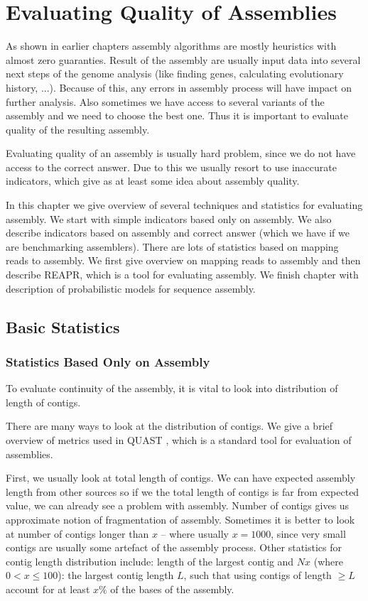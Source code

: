 \chapter{Evaluating Quality of Assemblies}

As shown in earlier chapters assembly algorithms are mostly
heuristics with almost zero guaranties. 
Result of the assembly are usually input data into several next steps
of the genome analysis (like finding genes, calculating evolutionary history, ...).
Because of this, any errors in assembly process will have impact on further analysis.
Also sometimes we have access to several variants of the assembly and we need
to choose the best one.
Thus it is important to evaluate quality of the resulting assembly.

Evaluating quality of an assembly is usually hard problem,
since we do not have access to the correct answer.
Due to this we usually resort to use inaccurate indicators, which
give as at least some idea about assembly quality.

In this chapter we give overview of several techniques and statistics
for evaluating assembly. We start with simple indicators based
only on assembly. We also describe indicators based on assembly and correct
answer (which we have if we are benchmarking assemblers). 
There are lots of statistics based on mapping reads to assembly. We first give
overview on mapping reads to assembly and then describe REAPR, which is a tool
for evaluating assembly. We finish chapter with description
of probabilistic models for sequence assembly.

\section{Basic Statistics}

\subsection{Statistics Based Only on Assembly}

To evaluate continuity of the assembly, it is vital
to look into distribution of length of contigs.

There are many ways to look at the distribution of contigs.
We give a brief overview of metrics used in QUAST \citep{Quast}, which
is a standard tool for evaluation of assemblies.

First, we usually look at total length of contigs. We can have expected assembly 
length from other sources so if we the total length of contigs is far from expected
value, we can already see a problem with assembly.
Number of contigs gives us approximate notion of fragmentation of assembly.
Sometimes it is better to look at number of contigs longer than $x$ -- where usually $x = 1000$,
since very small contigs are usually some artefact of the assembly process.
Other statistics for contig length distribution include:
length of the largest contig and $Nx$ (where $0 < x \leq 100$):
the largest contig length $L$, such that using contigs
of length $\geq L$ account for at least $x \%$ of the bases of the assembly.

